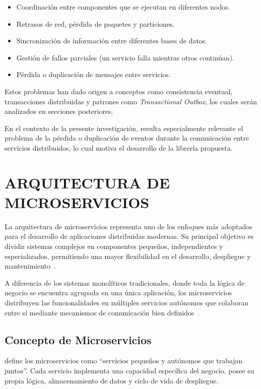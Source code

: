 \begin{itemize}
    \item Coordinación entre componentes que se ejecutan en diferentes nodos.
    \item Retrasos de red, pérdida de paquetes y particiones.
    \item Sincronización de información entre diferentes bases de datos.
    \item Gestión de fallos parciales (un servicio falla mientras otros continúan).
    \item Pérdida o duplicación de mensajes entre servicios.
\end{itemize}

Estos problemas han dado origen a conceptos como consistencia eventual, transacciones distribuidas y patrones como \textit{Transactional Outbox}, los cuales serán analizados en secciones posteriores.

En el contexto de la presente investigación, resulta especialmente relevante el problema de la pérdida o duplicación de eventos durante la comunicación entre servicios distribuidos, lo cual motiva el desarrollo de la librería propuesta.

\section{ARQUITECTURA DE MICROSERVICIOS}

La arquitectura de microservicios representa uno de los enfoques más adoptados para el desarrollo de aplicaciones distribuidas modernas. Su principal objetivo es dividir sistemas complejos en componentes pequeños, independientes y especializados, permitiendo una mayor flexibilidad en el desarrollo, despliegue y mantenimiento~\parencite{newman2015}.

A diferencia de los sistemas monolíticos tradicionales, donde toda la lógica de negocio se encuentra agrupada en una única aplicación, los microservicios distribuyen las funcionalidades en múltiples servicios autónomos que colaboran entre sí mediante mecanismos de comunicación bien definidos~\parencite{richardson2018}.

\subsection{Concepto de Microservicios}

\textcite{newman2015} define los microservicios como ``servicios pequeños y autónomos que trabajan juntos''. Cada servicio implementa una capacidad específica del negocio, posee su propia lógica, almacenamiento de datos y ciclo de vida de despliegue.

